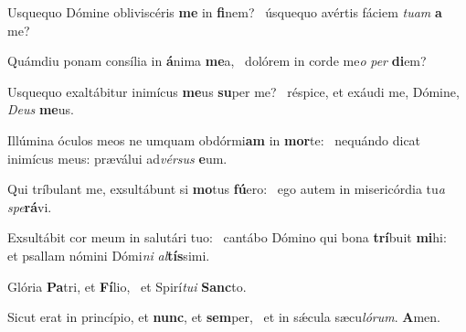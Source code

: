 \item Usquequo Dómine obliviscéris \textbf{me} in \textbf{fi}nem?~\psstar{} úsquequo avértis fáciem \textit{tuam} \textbf{a} me?
\item Quámdiu ponam consília in \textbf{á}nima \textbf{me}a,~\psstar{} dolórem in corde me\textit{o} \textit{per} \textbf{di}em?
\item Usquequo exaltábitur inimícus \textbf{me}us \textbf{su}per me?~\psstar{} réspice, et exáudi me, Dómine, \textit{Deus} \textbf{me}us.
\item Illúmina óculos meos ne umquam obdórmi\textbf{am} in \textbf{mor}te:~\psstar{} nequándo dicat inimícus meus: præválui ad\textit{vérsus} \textbf{e}um.
\item Qui tríbulant me, exsultábunt si \textbf{mo}tus \textbf{fú}ero:~\psstar{} ego autem in misericórdia tu\textit{a} \textit{spe}\textbf{rá}vi.
\item Exsultábit cor meum in salutári tuo:~\pscross{} cantábo Dómino qui bona \textbf{trí}buit \textbf{mi}hi:~\psstar{} et psallam nómini Dómi\textit{ni} \textit{al}\textbf{tís}simi.
\item Glória \textbf{Pa}tri, et \textbf{Fí}lio,~\psstar{} et Spirí\textit{tui} \textbf{Sanc}to.
\item Sicut erat in princípio, et \textbf{nunc}, et \textbf{sem}per,~\psstar{} et in sǽcula sæcu\textit{lórum}. \textbf{A}men.
